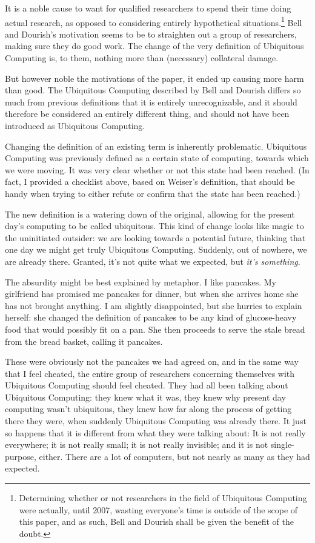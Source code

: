 It is a noble cause to want for qualified researchers to spend their time doing actual research, as opposed to
considering entirely hypothetical situations.\footnote{Determining whether or not researchers in the field of
Ubiquitous Computing were actually, until 2007, wasting everyone's time is outside of the scope of this paper,
and as such, Bell and Dourish shall be given the benefit of the doubt.} Bell and Dourish's motivation seems to
be to straighten out a group of researchers, making sure they do good work. The change of the very definition of
Ubiquitous Computing is, to them, nothing more than (necessary) collateral damage.

But however noble the motivations of the paper, it ended up causing more harm than good. The Ubiquitous Computing described
by Bell and Dourish differs so much from previous definitions that it is entirely unrecognizable, and it should therefore be considered
an entirely different thing, and should not have been introduced as Ubiquitous Computing.

Changing the definition of an existing term is inherently problematic. Ubiquitous Computing was previously defined
as a certain state of computing, towards which we were moving. It was very clear whether or not this state had been
reached. (In fact, I provided a checklist above, based on Weiser's definition, that should be handy when trying to
either refute or confirm that the state has been reached.)

The new definition is a watering down of the original, allowing for the present day's computing to be called ubiquitous.
This kind of change looks like magic to the uninitiated outsider: we are looking towards a potential future,
thinking that one day we might get truly Ubiquitous Computing. Suddenly, out of nowhere, we are already there.
Granted, it's not quite what we expected, but \emph{it's something}.

The absurdity might be best explained by metaphor. I like pancakes. My girlfriend has promised me pancakes for dinner,
but when she arrives home she has not brought anything. I am slightly disappointed, but she hurries to explain
herself: she changed the definition of pancakes to be any kind of glucose-heavy food that would possibly fit on a pan.
She then proceeds to serve the stale bread from the bread basket, calling it pancakes.

These were obviously not the pancakes we had agreed on, and in the same way that I feel cheated, the entire group of researchers concerning
themselves with Ubiquitous Computing should feel cheated. They had all been talking about Ubiquitous Computing: they knew
what it was, they knew why present day computing wasn't ubiquitous, they knew how far along the process of getting there they were, when suddenly
Ubiquitous Computing was already there. It just so happens that it is different from what they were talking about: It is
not really everywhere; it is not really small; it is not really invisible; and it is not single-purpose, either. There are
a lot of computers, but not nearly as many as they had expected.

